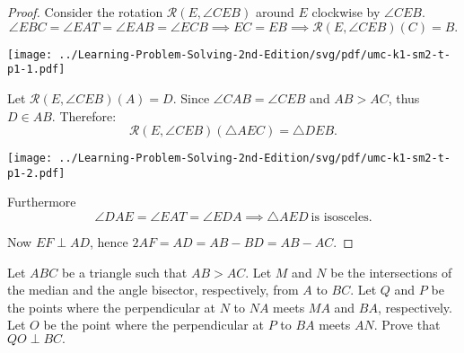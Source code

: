 \documentclass{article}
\begin{document}
\begin{proof}
    Consider the rotation $\mathcal{R}(E, \angle CEB)$ around $E$ clockwise by $\angle CEB$.
    \[ 
        \angle EBC = \angle EAT = \angle EAB = \angle ECB \implies EC = EB \implies \mathcal{R}(E, \angle CEB)(C)=B.
    \]
    \begin{center}
        \texttt{[image: ../Learning-Problem-Solving-2nd-Edition/svg/pdf/umc-k1-sm2-t-p1-1.pdf]}
    \end{center}

    Let $\mathcal{R}(E, \angle CEB)(A)=D.$ Since $\angle CAB = \angle CEB$ and $AB > AC$, thus $D \in AB.$
    Therefore:
    \[
        \mathcal{R}(E, \angle CEB)(\triangle AEC)= \triangle DEB.
    \]
    \begin{center}
        \texttt{[image: ../Learning-Problem-Solving-2nd-Edition/svg/pdf/umc-k1-sm2-t-p1-2.pdf]}
    \end{center}

    Furthermore
    \[ 
        \angle DAE = \angle EAT = \angle EDA \implies \triangle AED\ \text{is isosceles}.
    \]

    Now $EF \perp AD$, hence $2AF = AD = AB-BD = AB-AC.$
\end{proof}

\newpage

\begin{problem}
    Let $ABC$ be a triangle such that $AB > AC$. Let $M$ and $N$ be the intersections of the median and the angle bisector, respectively, from $A$ to $BC$.
    Let $Q$ and $P$ be the points where the perpendicular at $N$ to $NA$ meets $MA$ and $BA$, respectively.
    Let $O$ be the point where the perpendicular at $P$ to $BA$ meets $AN$.
    Prove that $QO \perp BC.$
\end{problem}
\end{document}
